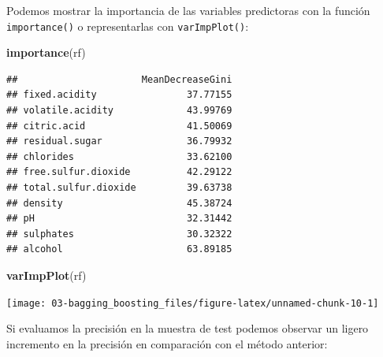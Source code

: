 \documentclass[]{book}
\newenvironment{Shaded}{\begin{snugshade}}{\end{snugshade}}
\newcommand{\KeywordTok}[1]{\textcolor[rgb]{0.13,0.29,0.53}{\textbf{#1}}}
\newcommand{\DataTypeTok}[1]{\textcolor[rgb]{0.13,0.29,0.53}{#1}}
\newcommand{\StringTok}[1]{\textcolor[rgb]{0.31,0.60,0.02}{#1}}
\newcommand{\OperatorTok}[1]{\textcolor[rgb]{0.81,0.36,0.00}{\textbf{#1}}}
\newcommand{\NormalTok}[1]{#1}
\theoremstyle{break}
\theoremstyle{definition}
\theoremstyle{definition}
\theoremstyle{definition}
\theoremstyle{remark}
\begin{document}
Podemos mostrar la importancia de las variables predictoras con la
función \texttt{importance()} o representarlas con
\texttt{varImpPlot()}:

\begin{Shaded}
\begin{Highlighting}[]
\KeywordTok{importance}\NormalTok{(rf)}
\end{Highlighting}
\end{Shaded}

\begin{verbatim}
##                      MeanDecreaseGini
## fixed.acidity                37.77155
## volatile.acidity             43.99769
## citric.acid                  41.50069
## residual.sugar               36.79932
## chlorides                    33.62100
## free.sulfur.dioxide          42.29122
## total.sulfur.dioxide         39.63738
## density                      45.38724
## pH                           32.31442
## sulphates                    30.32322
## alcohol                      63.89185
\end{verbatim}

\begin{Shaded}
\begin{Highlighting}[]
\KeywordTok{varImpPlot}\NormalTok{(rf)}
\end{Highlighting}
\end{Shaded}

\begin{center}\texttt{[image: 03-bagging\_boosting\_files/figure-latex/unnamed-chunk-10-1]} \end{center}

Si evaluamos la precisión en la muestra de test podemos observar un
ligero incremento en la precisión en comparación con el método anterior:

\begin{Shaded}
\end{Shaded}
\end{document}
